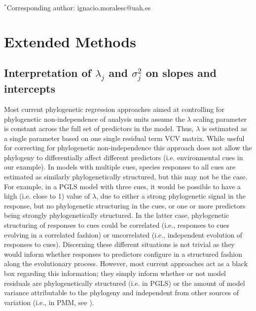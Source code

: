 \documentclass[11pt]{article}
\def\labelitemi{--}
\begin{document}
\vspace{2ex}
$^*$Corresponding author: ignacio.moralesc@uah.es\\
\renewcommand{\thetable}{S\arabic{table}}
\renewcommand{\thefigure}{S\arabic{figure}}
\renewcommand{\labelitemi}{$-$}

\clearpage




\section*{Extended Methods}

\subsection*{Interpretation of $\lambda_j$ and $\sigma_j^2$ on slopes and intercepts}

Most current phylogenetic regression approaches aimed at controlling for phylogenetic non-independence of analysis units \citep[i.e. species, see][]{revell2010phylogenetic} assume the $\lambda$ scaling parameter is constant across the full set of predictors in the model. Thus, $\lambda$ is estimated as a single parameter based on one single residual term VCV matrix. While useful for correcting for phylogenetic non-independence this approach does not allow the phylogeny to differentially affect different predictors (i.e. environmental cues in our example). In models with multiple cues, species responses to all cues are estimated as similarly phylogenetically structured, but this may not be the case. For example, in a PGLS model with three cues, it would be possible to have a high (i.e. close to 1) value of $\lambda$, due to either a strong phylogenetic signal in the response, but no phylogenetic structuring in the cues, or one or more predictors being strongly phylogenetically structured. In the latter case, phylogenetic structuring of responses to cues could be correlated (i.e., responses to cues evolving in a correlated fashion) or uncorrelated (i.e., independent evolution of responses to cues). Discerning these different situations is not trivial as they would inform whether responses to predictors configure in a structured fashion along the evolutionary process. However, most current approaches act as a black box regarding this information; they simply inform whether or not model residuals are phylogenetically structured (i.e. in PGLS) or the amount of model variance attributable to the phylogeny and independent from other sources of variation (i.e., in PMM, see \cite{housworth2004phylogenetic}).\\
\end{document}
